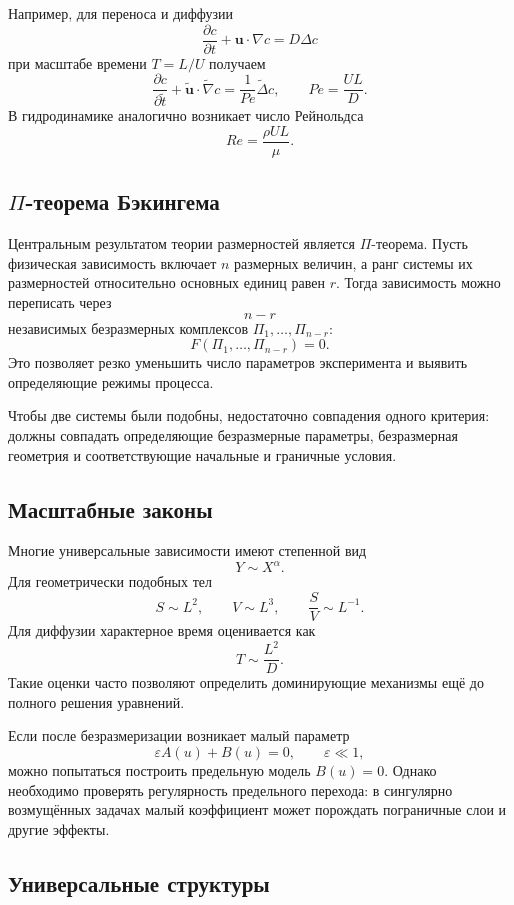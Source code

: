 Например, для переноса и диффузии
\[
\frac{\partial c}{\partial t}
+\mathbf u\cdot\nabla c
=D\Delta c
\]
при масштабе времени $T=L/U$ получаем
\[
\frac{\partial c}{\partial\widetilde t}
+\widetilde{\mathbf u}\cdot\widetilde\nabla c
=\frac1{Pe}\widetilde\Delta c,
\qquad
\boxed{Pe=\frac{UL}{D}}.
\]
В гидродинамике аналогично возникает число Рейнольдса
\[
\boxed{Re=\frac{\rho UL}{\mu}}.
\]

\subsection[Пи-теорема Бэкингема]{$\Pi$-теорема Бэкингема}

Центральным результатом теории размерностей является $\Pi$-теорема.
Пусть физическая зависимость включает $n$ размерных величин, а ранг системы
их размерностей относительно основных единиц равен $r$. Тогда зависимость
можно переписать через
\[
\boxed{n-r}
\]
независимых безразмерных комплексов $\Pi_1,\ldots,\Pi_{n-r}$:
\[
F(\Pi_1,\ldots,\Pi_{n-r})=0.
\]
Это позволяет резко уменьшить число параметров эксперимента и выявить
определяющие режимы процесса.

Чтобы две системы были подобны, недостаточно совпадения одного критерия:
должны совпадать определяющие безразмерные параметры, безразмерная геометрия
и соответствующие начальные и граничные условия.

\subsection{Масштабные законы}

Многие универсальные зависимости имеют степенной вид
\[
Y\sim X^\alpha.
\]
Для геометрически подобных тел
\[
S\sim L^2,
\qquad
V\sim L^3,
\qquad
\frac SV\sim L^{-1}.
\]
Для диффузии характерное время оценивается как
\[
\boxed{T\sim\frac{L^2}{D}}.
\]
Такие оценки часто позволяют определить доминирующие механизмы ещё до
полного решения уравнений.

Если после безразмеризации возникает малый параметр
\[
\varepsilon A(u)+B(u)=0,
\qquad \varepsilon\ll1,
\]
можно попытаться построить предельную модель $B(u)=0$. Однако необходимо
проверять регулярность предельного перехода: в сингулярно возмущённых
задачах малый коэффициент может порождать пограничные слои и другие эффекты.

\subsection{Универсальные структуры}

